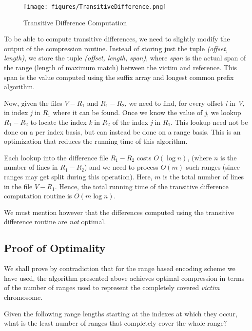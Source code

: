 \documentclass[11pt]{article}
\begin{document}
\begin{figure}
  \begin{center}
    \texttt{[image: figures/TransitiveDifference.png]}
    \caption{Transitive Difference Computation}
    \label{fig:transitivedifferencecomputation}
  \end{center}
\end {figure}

To be able to compute transitive differences, we need to slightly
modify the output of the compression routine. Instead of storing just
the tuple \textit{(offset, length)}, we store the tuple
\textit{(offset, length, span)}, where \textit{span} is the actual
span of the range (length of maximum match) between the victim and
reference. This span is the value computed using the suffix array and
longest common prefix algorithm.

Now, given the files \textit{$V - R_1$} and \textit{$R_1 - R_2$}, we
need to find, for every offset \textit{i} in \textit{V}, in index
\textit{j} in \textit{$R_1$} where it can be found. Once we know the
value of \textit{j}, we lookup \textit{$R_1 - R_2$} to locate the
index \textit{k} in \textit{$R_2$} of the index \textit{j} in
\textit{$R_1$}. This lookup need not be done on a per index basis, but
can instead be done on a range basis. This is an optimization that
reduces the running time of this algorithm.

Each lookup into the difference file \textit{$R_1 - R_2$} costs
$O(\log{n})$, (where $n$ is the number of lines in \textit{$R_1 -
  R_2$}) and we need to process \textit{$O(m)$} such ranges (since
ranges may get split during this operation). Here, $m$ is the total
number of lines in the file \textit{$V - R_1$}. Hence, the total
running time of the transitive difference computation routine is
$O(m\log{n})$.

We must mention however that the differences computed using the
transitive difference routine are \textit{not} optimal.

\subsection{Proof of Optimality}

We shall prove by contradiction that for the range based encoding
scheme we have used, the algorithm presented above achieves optimal
compression in terms of the number of ranges used to represent the
completely covered \textit{victim} chromosome.

Given the following range lengths starting at the indexes at which
they occur, what is the least number of ranges that completely cover
the whole range?
\end{document}

